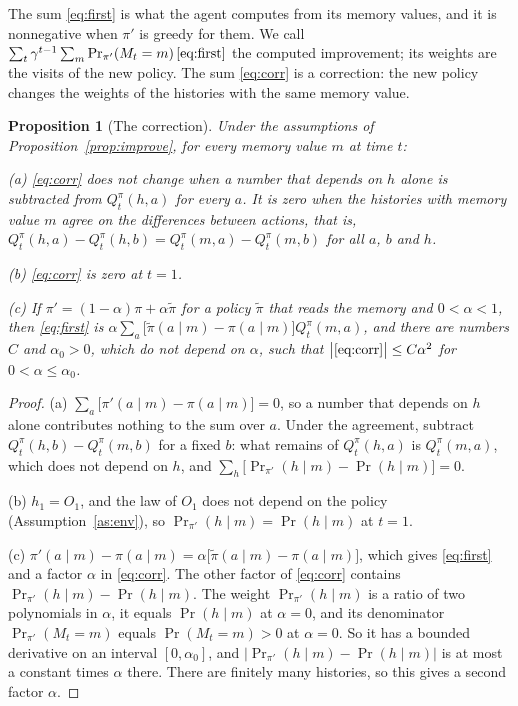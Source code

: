 \documentclass{article}
\newtheorem{proposition}{Proposition}[section]
\theoremstyle{definition}
\newcommand{\Prn}{\Pr\nolimits_{\pi'}}
\begin{document}
The sum \eqref{eq:first} is what the agent computes from its memory values, and it is nonnegative when $\pi'$ is greedy for them. We call $\sum_t\gamma^{t-1}\sum_m\Prn(M_t=m)\,\eqref{eq:first}$ the computed improvement; its weights are the visits of the new policy. The sum \eqref{eq:corr} is a correction: the new policy changes the weights of the histories with the same memory value.

\begin{proposition}[The correction]\label{prop:corr}
Under the assumptions of Proposition~\ref{prop:improve}, for every memory value $m$ at time $t$:

(a) \eqref{eq:corr} does not change when a number that depends on $h$ alone is subtracted from $Q^\pi_t(h,a)$ for every $a$. It is zero when the histories with memory value $m$ agree on the differences between actions, that is, $Q^\pi_t(h,a)-Q^\pi_t(h,b)=Q^\pi_t(m,a)-Q^\pi_t(m,b)$ for all $a$, $b$ and $h$.

(b) \eqref{eq:corr} is zero at $t=1$.

(c) If $\pi'=(1-\alpha)\pi+\alpha\tilde\pi$ for a policy $\tilde\pi$ that reads the memory and $0<\alpha<1$, then \eqref{eq:first} is $\alpha\sum_a\big[\tilde\pi(a\mid m)-\pi(a\mid m)\big]Q^\pi_t(m,a)$, and there are numbers $C$ and $\alpha_0>0$, which do not depend on $\alpha$, such that $\big|\eqref{eq:corr}\big|\le C\alpha^2$ for $0<\alpha\le\alpha_0$.
\end{proposition}

\begin{proof}
(a) $\sum_a\big[\pi'(a\mid m)-\pi(a\mid m)\big]=0$, so a number that depends on $h$ alone contributes nothing to the sum over $a$. Under the agreement, subtract $Q^\pi_t(h,b)-Q^\pi_t(m,b)$ for a fixed $b$: what remains of $Q^\pi_t(h,a)$ is $Q^\pi_t(m,a)$, which does not depend on $h$, and $\sum_h\big[\Prn(h\mid m)-\Pr(h\mid m)\big]=0$.

(b) $h_1=O_1$, and the law of $O_1$ does not depend on the policy (Assumption~\ref{as:env}), so $\Prn(h\mid m)=\Pr(h\mid m)$ at $t=1$.

(c) $\pi'(a\mid m)-\pi(a\mid m)=\alpha\big[\tilde\pi(a\mid m)-\pi(a\mid m)\big]$, which gives \eqref{eq:first} and a factor $\alpha$ in \eqref{eq:corr}. The other factor of \eqref{eq:corr} contains $\Prn(h\mid m)-\Pr(h\mid m)$. The weight $\Prn(h\mid m)$ is a ratio of two polynomials in $\alpha$, it equals $\Pr(h\mid m)$ at $\alpha=0$, and its denominator $\Prn(M_t=m)$ equals $\Pr(M_t=m)>0$ at $\alpha=0$. So it has a bounded derivative on an interval $[0,\alpha_0]$, and $\big|\Prn(h\mid m)-\Pr(h\mid m)\big|$ is at most a constant times $\alpha$ there. There are finitely many histories, so this gives a second factor $\alpha$.
\end{proof}
\end{document}
